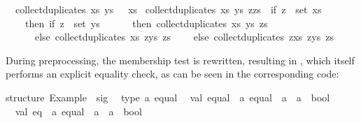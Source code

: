 \begin{isabellebody}
\ \ {}collect{}duplicates\ xs\ ys\ {}{}\ {}\ xs{}\isanewline
{}\ {}collect{}duplicates\ xs\ ys\ {}z{}zs{}\ {}\ {}if\ z\ {}\ set\ xs\isanewline
\ \ \ \ then\ if\ z\ {}\ set\ ys\isanewline
\ \ \ \ \ \ then\ collect{}duplicates\ xs\ ys\ zs\isanewline
\ \ \ \ \ \ else\ collect{}duplicates\ xs\ {}z{}ys{}\ zs\isanewline
\ \ \ \ else\ collect{}duplicates\ {}z{}xs{}\ {}z{}ys{}\ zs{}{}%
\endisatagquote
{\isafoldquote}%
%
\isadelimquote
%
\endisadelimquote
%
\begin{isamarkuptext}%
\noindent During preprocessing, the membership test is rewritten,
  resulting in , which itself performs an explicit
  equality check, as can be seen in the corresponding  code:%
\end{isamarkuptext}%
\isamarkuptrue%
%
\isadelimquotetypewriter
%
\endisadelimquotetypewriter
%
\isatagquotetypewriter
%
\begin{isamarkuptext}%
structure\ Example\ {}\ sig\isanewline
\ \ type\ {}a\ equal\isanewline
\ \ val\ equal\ {}\ {}a\ equal\ {}{}\ {}a\ {}{}\ {}a\ {}{}\ bool\isanewline
\ \ val\ eq\ {}\ {}a\ equal\ {}{}\ {}a\ {}{}\ {}a\ {}{}\ bool\isanewline

\end{isamarkuptext}
\end{isabellebody}
